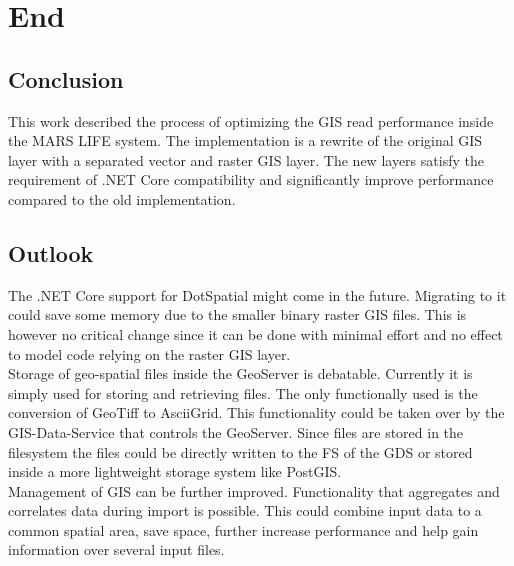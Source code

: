 
\chapter{End}



\section{Conclusion}
This work described the process of optimizing the GIS read performance inside the MARS LIFE system. The implementation is a rewrite of the original GIS layer with a separated vector and raster GIS layer. The new layers satisfy the requirement of .NET Core compatibility and significantly improve performance compared to the old implementation.


\section{Outlook}
The .NET Core support for DotSpatial might come in the future. Migrating to it could save some memory due to the smaller binary raster GIS files. This is however no critical change since it can be done with minimal effort and no effect to model code relying on the raster GIS layer.\\
Storage of geo-spatial files inside the GeoServer is debatable. Currently it is simply used for storing and retrieving files. The only functionally used is the conversion of GeoTiff to AsciiGrid. This functionality could be taken over by the GIS-Data-Service that controls the GeoServer. Since files are stored in the filesystem the files could be directly written to the FS of the GDS or stored inside a more lightweight storage system like PostGIS.\\
Management of GIS can be further improved. Functionality that aggregates and correlates data during import is possible. This could combine input data to a common spatial area, save space, further increase performance and help gain information over several input files.